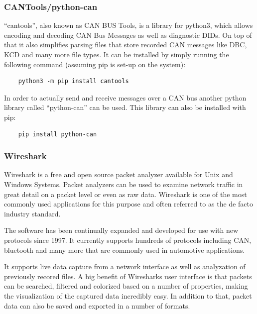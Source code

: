 \subsubsection{CANTools/python-can}
``cantools'', also known as CAN BUS Tools, is a library for python3, which allows encoding and decoding CAN Bus Messages as well as diagnostic DIDs. On top of that it also simplifies parsing files that store recorded CAN messages like DBC, KCD and many more file types.
It can be installed by simply running the following command (assuming pip is set-up on the system):
\begin{verbatim}
    python3 -m pip install cantools
\end{verbatim}
In order to actually send and receive messages over a CAN bus another python library called ``python-can'' can be used. This library can also be installed with pip:
\begin{verbatim}
    pip install python-can
\end{verbatim}

\subsubsection{Wireshark} \label{wiresharkintro}
Wireshark is a free and open source packet analyzer available for Unix and Windows Systems. Packet analyzers can be used to examine network traffic in great detail on a packet level or even as raw data. Wireshark is one of the most commonly used applications for this purpose and often referred to as the de facto industry standard.

The software has been continually expanded and developed for use with new protocols since 1997. It currently supports hundreds of protocols including CAN, bluetooth and many more that are commonly used in automotive applications.

It supports live data capture from a network interface as well as analyzation of previously recored files. A big benefit of Wiresharks user interface is that packets can be searched, filtered and colorized based on a number of properties, making the visualization of the captured data incredibly easy. In addition to that, packet data can also be saved and exported in a number of formats.

